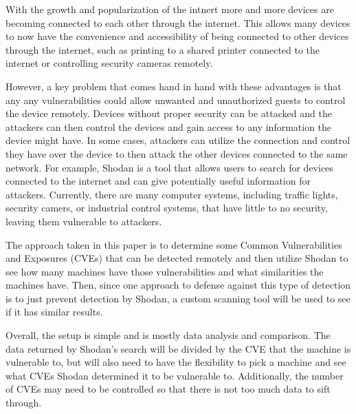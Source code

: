 With the growth and popularization of the intnert more and more devices
are becoming connected to each other through the internet. This allows many
devices to now have the convenience and accessibility of being connected
to other devices through the internet, such as printing to a
shared printer connected to the internet or controlling security cameras
remotely.

However, a key problem that comes hand in hand with these advantages is that
any any vulnerabilities could allow unwanted and unauthorized guests to
control the device remotely. Devices without proper security can be attacked
and the attackers can then control the devices and gain access to any
information the device might have. In some cases, attackers can utilize the
connection and control they have over the device to then attack the other
devices connected to the same network. For example, Shodan is a tool that
allows users to search for devices connected to the internet and can give
potentially useful information for attackers. Currently, there are many
computer systems, including traffic lights, security camers, or industrial
control systems, that have little to no security, leaving them vulnerable to
attackers\cite{Bodenheim}.

The approach taken in this paper is to determine some Common Vulnerabilities
and Exposures (CVEs) that can be detected remotely and then utilize Shodan
to see how many machines have those vulnerabilities and what similarities
the machines have. Then, since one approach to defense against this type of
detection is to just prevent detection by Shodan, a custom scanning tool
will be used to see if it has similar results.

Overall, the setup is simple and is mostly data analysis and comparison.
The data returned by Shodan's search will be divided by the CVE that the
machine is vulnerable to, but will also need to have the flexibility to
pick a machine and see what CVEs Shodan determined it to be vulnerable to.
Additionally, the number of CVEs may need to be controlled so that there
is not too much data to sift through.

